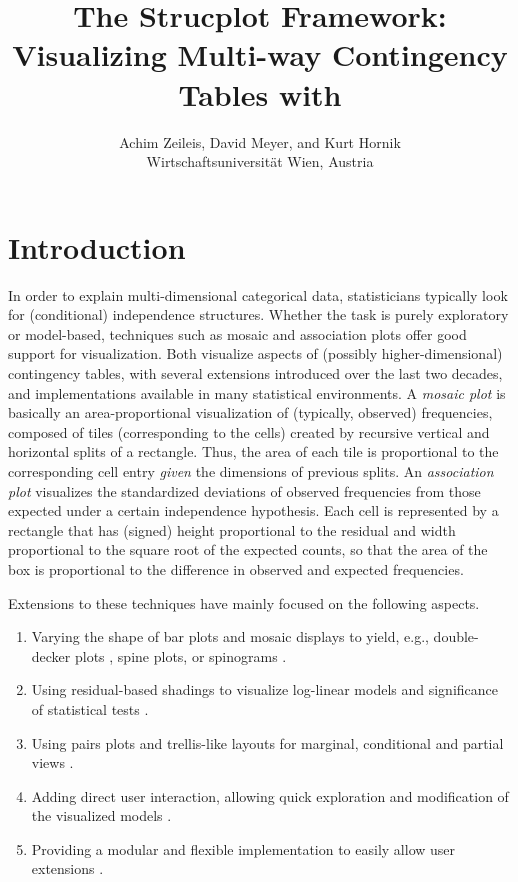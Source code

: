 \documentclass{Z}
\author{Achim Zeileis, David Meyer, \textnormal{and} Kurt Hornik\\Wirtschaftsuniversit\"at Wien, Austria}
\title{The Strucplot Framework:\\ Visualizing Multi-way Contingency
  Tables with \pkg{vcd}}
\begin{document}

\section[Introduction]{Introduction}


In order to explain multi-dimensional categorical data, statisticians
typically look for (conditional) independence structures. Whether the
task is purely exploratory or model-based, techniques such as mosaic and
association plots offer good support for visualization.  Both visualize
aspects of (possibly higher-dimensional) contingency tables, with
several extensions introduced over the last two decades, and
implementations available in many statistical environments.  A
\emph{mosaic plot} \citep{vcd:Hartigan+Kleiner:1984} is basically an
area-proportional visualization of (typically, observed) frequencies,
composed of tiles (corresponding to the cells) created by recursive
vertical and horizontal splits of a rectangle. Thus, the area of each tile
is proportional to the corresponding cell entry \emph{given} the
dimensions of previous splits. An \emph{association plot}
\citep{vcd:Cohen:1980} visualizes the standardized deviations of
observed frequencies from those expected under a certain independence
hypothesis.  Each cell is represented by a rectangle that has (signed)
height proportional to the residual and width proportional to the square
root of the expected counts, so that the area of the box is proportional
to the difference in observed and expected frequencies.

Extensions to these techniques have mainly focused on the following
aspects.

\begin{enumerate}
\item Varying the shape of bar plots and mosaic displays to yield, e.g.,
  double-decker plots \citep{vcd:hofmann:2001}, spine plots, or
  spinograms \citep{vcd:hofmann+theus}.
\item Using residual-based shadings to visualize log-linear models
  \citep{vcd:Friendly:1994,vcd:Friendly:2000} and significance of
  statistical tests \citep{vcd:Meyer+Zeileis+Hornik:2003,vcd:Zeileis+Meyer+Hornik:2005}.
\item Using pairs plots and trellis-like layouts for marginal, conditional and
  partial views \citep{vcd:Friendly:1999}.
\item Adding direct user interaction, allowing quick exploration and
  modification of the visualized models 
  \citep{vcd:Unwin+Hawkins+Hofmann:1996,vcd:Theus:2003}.
\item Providing a modular and flexible implementation to easily allow
  user extensions \citep{vcd:Meyer+Zeileis+Hornik:2003,vcd:Meyer+Zeileis+Hornik:2006b}.
\end{enumerate}
\end{document}
